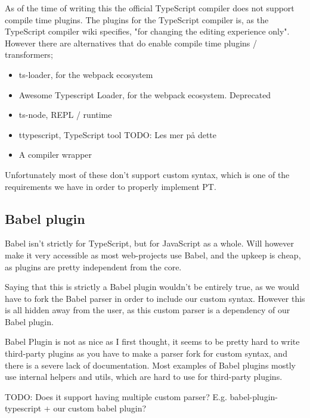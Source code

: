 As of the time of writing this the official TypeScript compiler does not support compile time plugins. The plugins for the TypeScript compiler is, as the TypeScript compiler wiki specifies, "for changing the editing experience only"\cite{tscplugin}.
However there are alternatives that do enable compile time plugins / transformers;

\begin{itemize}
    \item ts-loader\cite{tsloadergithub}, for the webpack ecosystem
    \item Awesome Typescript Loader\cite{awesometypescriptloadergithub}, for the webpack ecosystem. Deprecated
    \item ts-node\cite{tsnodegithub}, REPL / runtime
    \item ttypescript\cite{ttypescriptgithub}, TypeScript tool TODO: Les mer på dette
    \item A compiler wrapper
\end{itemize}

Unfortunately most of these don't support custom syntax, which is one of the requirements we have in order to properly implement PT.


\subsection{Babel plugin}\label{subsec:babel-plugin}

Babel isn't strictly for TypeScript, but for JavaScript as a whole.
Will however make it very accessible as most web-projects use Babel, and the upkeep is cheap, as plugins are pretty independent from the core.

Saying that this is strictly a Babel plugin wouldn't be entirely true, as we would have to fork the Babel parser in order to include our custom syntax\cite{babelparserdocs}.
However this is all hidden away from the user, as this custom parser is a dependency of our Babel plugin.

Babel Plugin is not as nice as I first thought, it seems to be pretty hard to write third-party plugins as you have to make a parser fork for custom syntax, and there is a severe lack of documentation.
Most examples of Babel plugins mostly use internal helpers and utils, which are hard to use for third-party plugins.

TODO: Does it support having multiple custom parser?
E.g. babel-plugin-typescript + our custom babel plugin?
